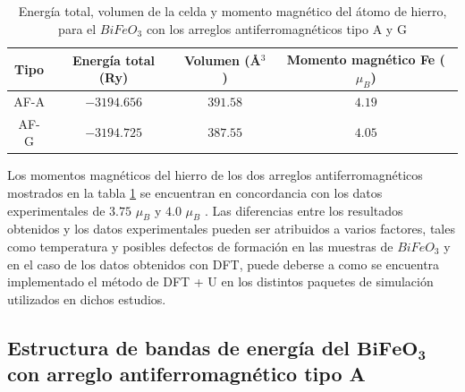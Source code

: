 % 
% 

\begin{table}[H]
    \begin{center}
        \caption{Energ\'ia total, volumen de la celda y momento 
            magn\'etico del 
            \'atomo de hierro,
            para el $BiFeO_{3}$ con los arreglos antiferromagn\'eticos tipo A y 
            G}
        \begin{tabular}{cccc}
            \hline
            \textbf{Tipo} & \textbf{Energ\'ia total (Ry)} & 
            \textbf{Volumen 
                (\AA $^{3}$)} & \textbf{Momento magn\'etico Fe ($\mu 
                _{B}$)}\\
            \hline \hline
            AF-A & $-3194.656$ & $391.58$ & $4.19$ \\
            \hline
            AF-G & $-3194.725$ & $387.55$ & $4.05$ \\
            \hline
        \end{tabular}
        \singlespace
        \label{tabla_BiFeO3_ener_vol_mag}
    \end{center}
\end{table}

\noindent Los momentos magn\'eticos del hierro de los dos arreglos 
antiferromagn\'eticos 
mostrados en la tabla \ref{tabla_BiFeO3_ener_vol_mag} se encuentran en 
concordancia con los datos experimentales de $3.75$ $\mu _{B}$ 
\cite{fischer1980} 
y $4.0$ $\mu _{B}$ \cite{sosnowska2002}. Las diferencias entre los resultados 
obtenidos y los datos experimentales pueden ser atribuidos a varios factores, 
tales como temperatura y posibles defectos de formaci\'on en las muestras de 
$BiFeO_{3}$ y en el caso de los datos obtenidos con DFT, puede deberse a como 
se encuentra implementado el m\'etodo de DFT + U en los distintos paquetes de 
simulaci\'on utilizados en dichos estudios.

\subsection{Estructura de bandas de energ\'ia del $\mathbf{BiFeO_{3}}$ con 
arreglo antiferromagn\'etico tipo A}


